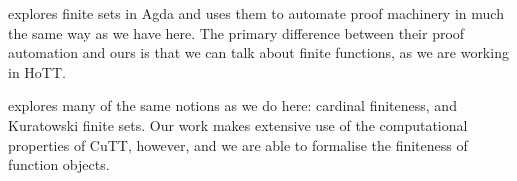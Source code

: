 \cite{firsovDependentlyTypedProgramming2015} explores finite sets in Agda and
uses them to automate proof machinery in much the same way as we have here.
The primary difference between their proof automation and ours is that we can
talk about finite functions, as we are working in HoTT.

\cite{fruminFiniteSetsHomotopy2018} explores many of the same notions as we do
here: cardinal finiteness, and Kuratowski finite sets.
Our work makes extensive use of the computational properties of CuTT, however,
and we are able to formalise the finiteness of function objects.


